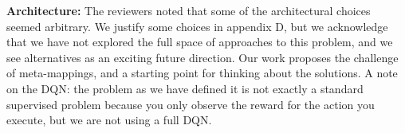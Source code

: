 \documentclass{article}
\begin{document}
\textbf{Architecture:} The reviewers noted that some of the architectural choices seemed arbitrary. We justify some choices in appendix D, but we acknowledge that we have not explored the full space of approaches to this problem, and we see alternatives as an exciting future direction. Our work proposes the challenge of meta-mappings, and a starting point for thinking about the solutions. A note on the DQN: the problem as we have defined it is not exactly a standard supervised problem because you only observe the reward for the action you execute, but we are not using a full DQN. \par 
\end{document}
